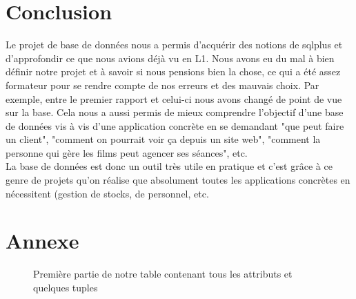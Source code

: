 \documentclass[a4paper,sffamily,12pt]{article}
\begin{document}
														
	\section{Conclusion}

		\vspace{0.5cm}
				
			Le projet de base de données nous a permis d'acquérir des notions de sqlplus et d'approfondir ce que nous avions déjà vu en L1. Nous avons eu du mal à bien définir notre projet et à savoir si nous pensions bien la chose, ce qui a été assez formateur pour se rendre compte de nos erreurs et des mauvais choix. Par exemple, entre le premier rapport et celui-ci nous avons changé de point de vue sur la base. Cela nous a aussi permis de mieux comprendre l'objectif d'une base de données vis à vis d'une application concrète en se demandant "que peut faire un client", "comment on pourrait voir ça depuis un site web", "comment la personne qui gère les films peut agencer ses séances", etc.\\
			\indent La base de données est donc un outil très utile en pratique et c'est grâce à ce genre de projets qu'on réalise que absolument toutes les applications concrètes en nécessitent (gestion de stocks, de personnel, etc.\\

		\newpage
	
	\section{Annexe}
					
		\begin{figure}[!h]		
			\centering
			\caption{Première partie de notre table contenant tous les attributs et quelques tuples}
			\label{table_p1}	
		\end{figure}			
\end{document}
